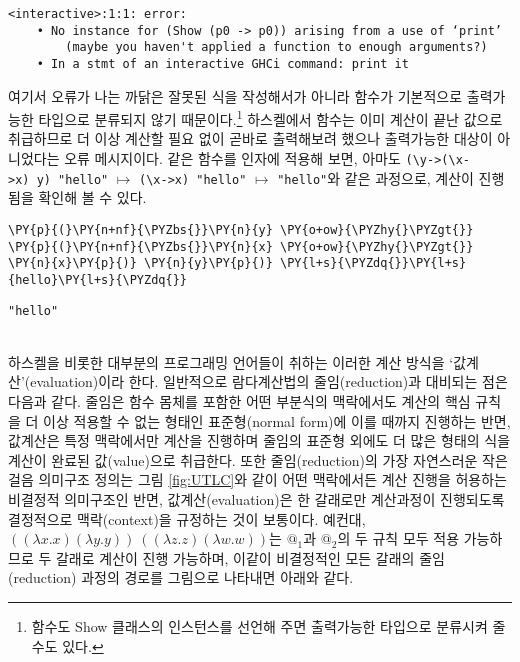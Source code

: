     \begin{Verbatim}[commandchars=\\\{\}, frame=single, framerule=1mm, rulecolor=\color{outerrorbackground}]
<interactive>:1:1: error:
    • No instance for (Show (p0 -> p0)) arising from a use of ‘print’
        (maybe you haven't applied a function to enough arguments?)
    • In a stmt of an interactive GHCi command: print it
    \end{Verbatim}

    \noindent 여기서 오류가 나는 까닭은 잘못된 식을 작성해서가 아니라 함수가
기본적으로 출력가능한 타입으로 분류되지 않기
때문이다.\footnote{함수도 Show 클래스의
인스턴스를 선언해 주면 출력가능한 타입으로 분류시켜 줄 수도 있다.}
하스켈에서 함수는 이미 계산이 끝난 값으로 취급하므로 더 이상 계산할 필요
없이 곧바로 출력해보려 했으나 출력가능한 대상이 아니었다는 오류
메시지이다. 같은 함수를 인자에 적용해 보면, 아마도
\texttt{(\textbackslash{}y-\textgreater{}(\textbackslash{}x-\textgreater{}x)\ y)\ "hello"}
\(\longmapsto\) \texttt{(\textbackslash{}x-\textgreater{}x)\ "hello"}
\(\longmapsto\) \texttt{"hello"}와 같은 과정으로, 계산이 진행됨을 확인해
볼 수 있다.

    \begin{tcolorbox}[breakable, size=fbox, boxrule=1pt, pad at break*=1mm,colback=cellbackground, colframe=cellborder, top=.75ex]
\begin{Verbatim}[commandchars=\\\{\}]
\PY{p}{(}\PY{n+nf}{\PYZbs{}}\PY{n}{y} \PY{o+ow}{\PYZhy{}\PYZgt{}} \PY{p}{(}\PY{n+nf}{\PYZbs{}}\PY{n}{x} \PY{o+ow}{\PYZhy{}\PYZgt{}} \PY{n}{x}\PY{p}{)} \PY{n}{y}\PY{p}{)} \PY{l+s}{\PYZdq{}}\PY{l+s}{hello}\PY{l+s}{\PYZdq{}}
\end{Verbatim}
\end{tcolorbox}

    
    \begin{Verbatim}[commandchars=\\\{\}]
"hello"
    \end{Verbatim}

    ~\\[-2ex]\indent
    하스켈을 비롯한 대부분의 프로그래밍 언어들이 취하는 이러한 계산 방식을
`값계산'(evaluation)이라 한다. 일반적으로 람다계산법의 줄임(reduction)과
대비되는 점은 다음과 같다. 줄임은 함수 몸체를 포함한 어떤 부분식의
맥락에서도 계산의 핵심 규칙을 더 이상 적용할 수 없는 형태인
표준형(normal form)에 이를 때까지 진행하는 반면, 값계산은 특정
맥락에서만 계산을 진행하며 줄임의 표준형 외에도 더 많은 형태의 식을
계산이 완료된 값(value)으로 취급한다. 또한 줄임(reduction)의 가장
자연스러운 작은걸음 의미구조 정의는 그림 \ref{fig:UTLC}와 같이 어떤
맥락에서든 계산 진행을 허용하는 비결정적 의미구조인 반면,
값계산(evaluation)은 한 갈래로만 계산과정이 진행되도록 결정적으로
맥락(context)을 규정하는 것이 보통이다. 예컨대,
\(((\lambda x.x)(\lambda y.y))~((\lambda z.z)(\lambda w.w))\)는
\(\textrm{@}_1\)과 \(\textrm{@}_2\)의 두 규칙 모두 적용 가능하므로 두
갈래로 계산이 진행 가능하며, 이같이 비결정적인 모든 갈래의
줄임(reduction) 과정의 경로를 그림으로 나타내면 아래와 같다.


